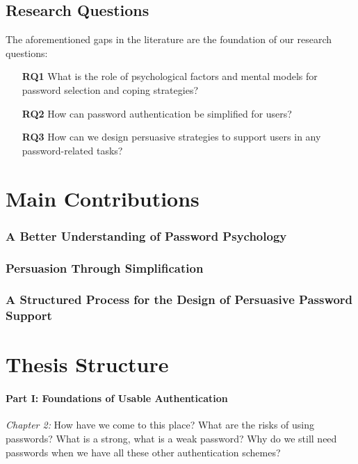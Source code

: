 \subsection{Research Questions}
The aforementioned gaps in the literature are the foundation of our research questions:
\begin{itemize}
	\item[\textbf{RQ1}] What is the role of psychological factors and mental models for password selection and coping strategies?
	\item[\textbf{RQ2}] How can password authentication be simplified for users? 
	\item[\textbf{RQ3}] How can we design persuasive strategies to support users in any password-related tasks?
\end{itemize}

\section{Main Contributions}
\subsubsection{A Better Understanding of Password Psychology}

\subsubsection{Persuasion Through Simplification}

\subsubsection{A Structured Process for the Design of Persuasive Password Support}



\section{Thesis Structure}
\paragraph{Part I: Foundations of Usable Authentication}

\textit{Chapter 2:} %
How have we come to this place?
What are the risks of using passwords?
What is a strong, what is a weak password?
Why do we still need passwords when we have all these other authentication schemes?

